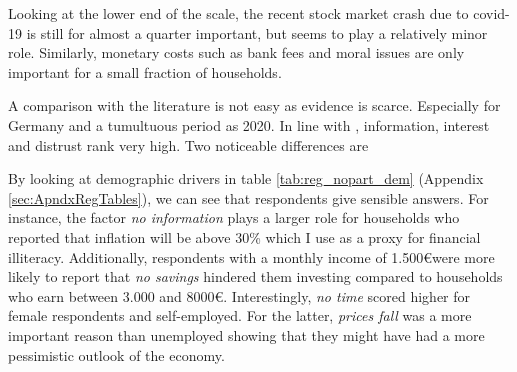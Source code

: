 \documentclass[ProjectABM]{subfiles}
\begin{document}

Looking at the lower end of the scale, the recent stock market crash due to covid-19 is still for almost a quarter important, but seems to play a relatively minor role. Similarly, monetary costs such as bank fees and moral issues are only important for a small fraction of households.



A comparison with the literature is not easy as evidence is scarce. Especially for Germany and a tumultuous period as 2020. In line with \cite{choi_2020}, information, interest and distrust rank very high. Two noticeable differences are 


By looking at demographic drivers in table \ref{tab:reg_nopart_dem} (Appendix \ref{sec:ApndxRegTables}), we can see that respondents give sensible answers. For instance, the factor \textit{no information} plays a larger role for households who reported that inflation will be above 30\% which I use as a proxy for financial illiteracy. Additionally, respondents with a monthly income of 1.500\euro were more likely to report that \textit{no savings} hindered them investing compared to households who earn between 3.000 and 8000\euro. Interestingly, \textit{no time} scored higher for female respondents and self-employed. For the latter, \textit{prices fall} was a more important reason than unemployed showing that they might have had a more pessimistic outlook of the economy.



\end{document}
